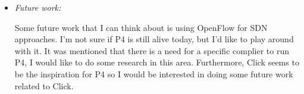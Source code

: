 \documentclass[letterpaper,twocolumn,10pt]{article}
\begin{document}
\begin{itemize}
\item {\it Future work:} 

Some future work that I can think about is using OpenFlow for SDN approaches.  I'm not sure if P4 is still
alive today, but I'd like to play around with it. It was mentioned that there is a need for a specific complier
to run P4, I would like to do some research in this area. Furthermore, Click seems to be the inspiration for
P4 so I would be interested in doing some future work related to Click.

\end{itemize}

{
  \small 
  
  
}
\end{document}
